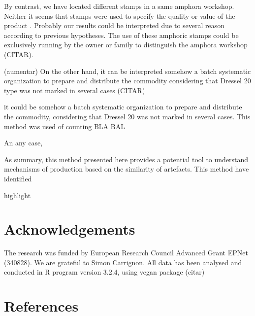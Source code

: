 \documentclass[review]{elsarticle}
\begin{document}
By contrast, we have located different stamps in a same amphora workshop. Neither it seems that stamps were used to specify the quality or value of the product \citep{callender}. Probably our results could be interpreted due to several reason according to previous hypotheses. The use of these amphoric stamps could be exclusively running by the owner or family to distinguish the amphora workshop (CITAR). 

(aumentar)
On the other hand, it can be interpreted somehow a batch systematic organization to prepare and distribute the commodity considering that Dressel 20 type was not marked in several cases (CITAR)


it could be somehow a batch systematic organization to prepare and distribute the commodity, considering that Dressel 20 was not marked in several cases. This method was used of counting BLA BAL 

 

An any case, 

As summary, this method presented here provides a potential tool to understand mechanisms of production based on the similarity of artefacts.  This method have identified 

highlight 


\section{Acknowledgements}

The research was funded by European Research Council Advanced Grant EPNet (340828). We are grateful to Simon Carrignon. 
All data has been analysed and conducted in R program version 3.2.4, using vegan package (citar) 


\section{References}


\end{document}
